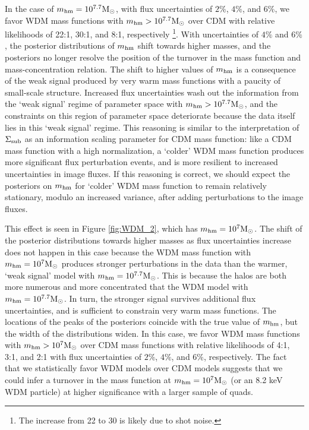 In the case of ${m_{\rm{hm}}}=10^{7.7}{\rm{M}_{\odot}}$, with flux uncertainties of $2\%$, $4\%$, and $6\%$, we favor WDM mass functions with ${m_{\rm{hm}}} > 10^{7.7} {\rm{M}_{\odot}}$ over CDM with relative likelihoods of 22:1, 30:1, and 8:1, respectively \footnote{The increase from 22 to 30 is likely due to shot noise.}. With uncertainties of $4\%$ and $6\%$, the posterior distributions of ${m_{\rm{hm}}}$ shift towards higher masses, and the posteriors no longer resolve the position of the turnover in the mass function and mass-concentration relation. The shift to higher values of ${m_{\rm{hm}}}$ is a consequence of the weak signal produced by very warm mass functions with a paucity of small-scale structure. Increased flux uncertainties wash out the information from the `weak signal' regime of parameter space with ${m_{\rm{hm}}} > 10^{7.7} {\rm{M}_{\odot}}$, and the constraints on this region of parameter space deteriorate because the data itself lies in this `weak signal' regime. This reasoning is similar to the interpretation of $\Sigma_{\rm{sub}}$ as an information scaling parameter for CDM mass function: like a CDM mass function with a high normalization, a `colder' WDM mass function produces more significant flux perturbation events, and is more resilient to increased uncertainties in image fluxes. If this reasoning is correct, we should expect the posteriors on ${m_{\rm{hm}}}$ for `colder' WDM mass function to remain relatively stationary, modulo an increased variance, after adding perturbations to the image fluxes. 

This effect is seen in Figure \ref{fig:WDM_2}, which has ${m_{\rm{hm}}}=10^{7}{\rm{M}_{\odot}}$. The shift of the posterior distributions towards higher masses as flux uncertainties increase does not happen in this case because the WDM mass function with ${m_{\rm{hm}}} = 10^{7} {\rm{M}_{\odot}}$ produces stronger perturbations in the data than the warmer, `weak signal' model with ${m_{\rm{hm}}} = 10^{7.7}{\rm{M}_{\odot}}$. This is because the halos are both more numerous and more concentrated that the WDM model with $m_{\rm{hm}} = 10^{7.7}{\rm{M}_{\odot}}$. In turn, the stronger signal survives additional flux uncertainties, and is sufficient to constrain very warm mass functions. The locations of the peaks of the posteriors coincide with the true value of ${m_{\rm{hm}}}$, but the width of the distributions widen. In this case, we favor WDM mass functions with ${m_{\rm{hm}}} > 10^{7} {\rm{M}_{\odot}}$ over CDM mass functions with relative likelihoods of 4:1, 3:1, and 2:1 with flux uncertainties of $2 \%$, $4 \%$, and $6 \%$, respectively. The fact that we statistically favor WDM models over CDM models suggests that we could infer a turnover in the mass function at ${m_{\rm{hm}}} = 10^{7}{\rm{M}_{\odot}}$ (or an 8.2 keV WDM particle) at higher significance with a larger sample of quads.

